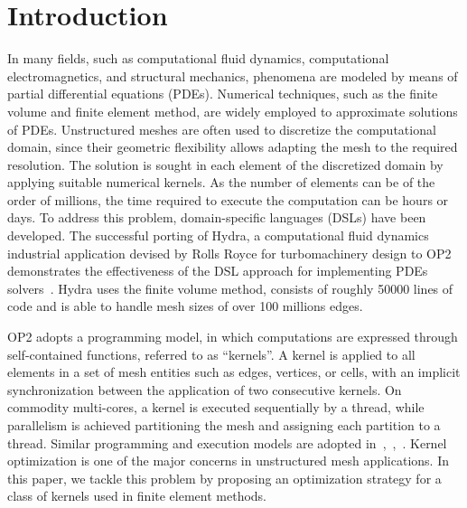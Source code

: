 \documentclass[conference]{IEEEtran}
\begin{document}
\section{Introduction}
In many fields, such as computational fluid dynamics, computational electromagnetics, and structural mechanics, phenomena are modeled by means of partial differential equations (PDEs). Numerical techniques, such as the finite volume and finite element method, are widely employed to approximate solutions of PDEs. Unstructured meshes are often used to discretize the computational domain, since their geometric flexibility allows adapting the mesh to the required resolution. The solution is sought in each element of the discretized domain by applying suitable numerical kernels. As the number of elements can be of the order of millions, the time required to execute the computation can be hours or days. To address this problem, domain-specific languages (DSLs) have been developed. The successful porting of Hydra, a computational fluid dynamics industrial application devised by Rolls Royce for turbomachinery design to OP2~\cite{pyop2isc} demonstrates the effectiveness of the DSL approach for implementing PDEs solvers~\cite{IstvanHydra}. Hydra uses the finite volume method, consists of roughly 50000 lines of code and is able to handle mesh sizes of over 100 millions edges.


OP2 adopts a programming model, in which computations are expressed through self-contained functions, referred to as ``kernels''. A kernel is applied to all elements in a set of mesh entities such as edges, vertices, or cells, with an implicit synchronization between the application of two consecutive kernels. On commodity multi-cores, a kernel is executed sequentially by a thread, while parallelism is achieved partitioning the mesh and assigning each partition to a thread. Similar programming and execution models are adopted in~\cite{Fenics},~\cite{fluidity_manual_v4},~\cite{lizst}. Kernel optimization is one of the major concerns in unstructured mesh applications. In this paper, we tackle this problem by proposing an optimization strategy for a class of kernels used in finite element methods.

\end{document}
